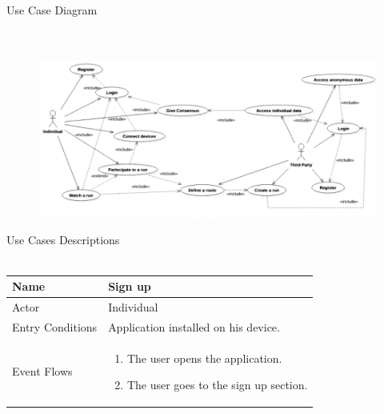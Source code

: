 \documentclass{article}
\begin{document}
\begin{legal}
\begin{legal}
\begin{legal}
{\begin{legal}
		\end{legal}
		}
    		\item Use Case Diagram\\\\
		\\
    			\begin{figure}[H]
			  	\includegraphics[width=\linewidth]{./images/usecase.png}
				\end{figure}
				\item Use Cases Descriptions\\\\
				\begin{tabular}{| m{3.5cm} | m{8cm}| }
				\hline
					Name & Sign up\\
				\hline
					Actor & Individual\\
				\hline
					Entry Conditions & Application installed
				on his device.\\
				\hline
					Event Flows & \begin{enumerate}
									\item The user opens the application.
									\item The user goes to the sign up section.
									

\end{enumerate}
\end{tabular}
\end{legal}
\end{legal}
\end{legal}
\end{document}
